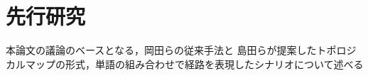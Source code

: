\chapter{先行研究}
\label{chap:prior}
本論文の議論のベースとなる，岡田らの従来手法と
島田らが提案したトポロジカルマップの形式，単語の組み合わせで経路を表現したシナリオについて述べる


